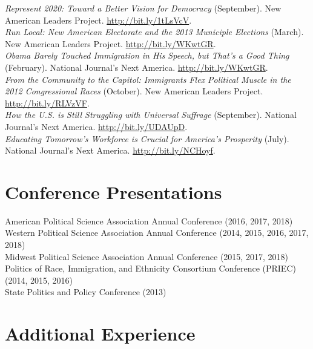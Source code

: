 \documentclass[11pt, a4paper]{article}
\newcommand{\years}[1]{\marginnote{\scriptsize #1}}
\begin{document}
\years{}\textit{Represent 2020: Toward a Better Vision for Democracy} (September). New American Leaders Project. \href{http://bit.ly/1tLsVcV}{http://bit.ly/1tLsVcV}.\\
\years{2013}\textit{Run Local: New American Electorate and the 2013 Municiple Elections} (March). New American Leaders Project. \href{http://bit.ly/WKwtGR}{http://bit.ly/WKwtGR}.\\
\years{}\textit{Obama Barely Touched Immigration in His Speech, but That's a Good Thing} (February). National Journal's Next America. \href{http://bit.ly/12R7lVG}{http://bit.ly/WKwtGR}.\\
\years{2012}\textit{From the Community to the Capitol: Immigrants Flex Political Muscle in the 2012 Congressional Races} (October). New American Leaders Project. \href{http://bit.ly/RLVzVF}{http://bit.ly/RLVzVF}.\\
\years{}\textit{How the U.S. is Still Struggling with Universal Suffrage} (September). National Journal's Next America.  \href{http://bit.ly/UDAUpD}{http://bit.ly/UDAUpD}.\\
\years{}\textit{Educating Tomorrow's Workforce is Crucial for America's Prosperity} (July). National Journal's Next America. \href{http://bit.ly/NCHoyf}{http://bit.ly/NCHoyf}.\\

\section*{Conference Presentations}

\years{}American Political Science Association Annual Conference (2016, 2017, 2018)\\
\years{}Western Political Science Association Annual Conference (2014, 2015, 2016, 2017, 2018)\\
\years{}Midwest Political Science Association Annual Conference (2015, 2017, 2018)\\
\years{}Politics of Race, Immigration, and Ethnicity Consortium Conference (PRIEC) (2014, 2015, 2016)\\
\years{}State Politics and Policy Conference (2013)

\section*{Additional Experience}
\end{document}
